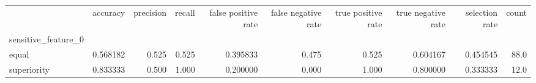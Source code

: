 \begin{tabular}{lrrrrrrrrr}
\toprule
{} &  accuracy &  precision &  recall &  false positive rate &  false negative rate &  true positive rate &  true negative rate &  selection rate &  count \\
sensitive\_feature\_0 &           &            &         &                      &                      &                     &                     &                 &        \\
\midrule
equal               &  0.568182 &      0.525 &   0.525 &             0.395833 &                0.475 &               0.525 &            0.604167 &        0.454545 &   88.0 \\
superiority         &  0.833333 &      0.500 &   1.000 &             0.200000 &                0.000 &               1.000 &            0.800000 &        0.333333 &   12.0 \\
\bottomrule
\end{tabular}
